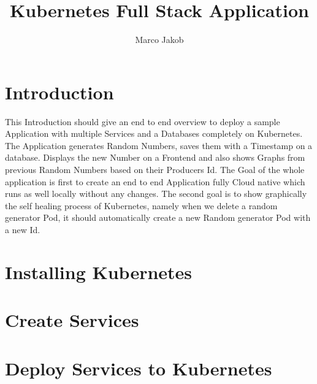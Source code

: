 \documentclass{article}
\author{Marco Jakob}
\title{Kubernetes Full Stack Application}
\begin{document}
\maketitle
\newpage
\tableofcontents
\newpage

\section{Introduction}
This Introduction should give an end to end overview to deploy a sample Application with multiple Services and a Databases completely on Kubernetes.
The Application generates Random Numbers, saves them with a Timestamp on a database. Displays the new Number on a Frontend and also shows Graphs from previous Random Numbers based on their Producers Id.
The Goal of the whole application is first to create an end to end Application fully Cloud native which runs as well locally without any changes. The second goal is to show graphically the self healing process of Kubernetes, namely when we delete a random generator Pod, it should automatically create a new Random generator Pod with a new Id.

\section{Installing Kubernetes}

\section{Create Services}


\section{Deploy Services to Kubernetes}
\end{document}
